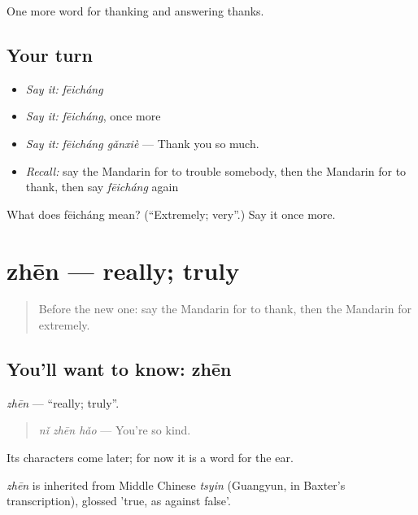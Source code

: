 \begin{grammarlens}[title={What you've built}]
One more word for thanking and answering thanks.
\end{grammarlens}

\subsection*{Your turn}
\begin{itemize}
\raggedright
  \item \emph{Say it:} \emph{fēicháng}
  \item \emph{Say it:} \emph{fēicháng}, once more
  \item \emph{Say it:} \emph{fēicháng gǎnxiè} — Thank you so much.
  \item \emph{Recall:} say the Mandarin for to trouble somebody, then the Mandarin for to thank, then say \emph{fēicháng} again
\end{itemize}

\begin{tcolorbox}[breakable,colback=teal!4,colframe=teal!35!black,title={Before you move on}]
What does fēicháng mean? (\textquotedblleft{}Extremely; very\textquotedblright{}.) Say it once more.
\end{tcolorbox}
\section[zhēn]{zhēn — really; truly}

\label{lesson:ZH-C77-zhen}



\begin{quote}
Before the new one: say the Mandarin for to thank, then the Mandarin for extremely.
\end{quote}

\subsection*{You'll want to know: zhēn}
\emph{zhēn} — \textquotedblleft{}really; truly\textquotedblright{}.

\begin{quote}
\emph{nǐ zhēn hǎo} — You're so kind.
\end{quote}

Its characters come later; for now it is a word for the ear.

\begin{cousinweb}
\emph{zhēn} is inherited from Middle Chinese \emph{tsyin} (Guangyun, in Baxter's transcription), glossed 'true, as against false'.
\end{cousinweb}

